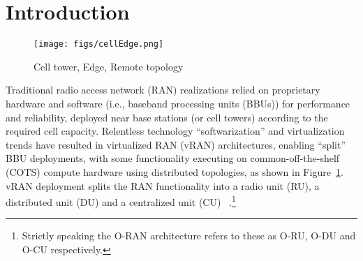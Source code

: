 \section{Introduction}

\begin{figure}
  \centering
        \texttt{[image: figs/cellEdge.png]}
        \caption{Cell tower, Edge, Remote topology}
        \label{fig:disttopo}
\end{figure}

Traditional radio access network (RAN) realizations relied on proprietary hardware and software (i.e., baseband processing units (BBUs)) for performance and reliability, deployed near base stations (or cell towers) according to the required cell capacity. Relentless technology ``softwarization'' and virtualization trends have resulted in virtualized RAN (vRAN) architectures, enabling ``split'' BBU deployments, with some functionality executing on common-off-the-shelf (COTS) compute hardware using distributed topologies, as shown in Figure~\ref{fig:disttopo}.
vRAN deployment splits the RAN functionality into a radio unit (RU), a distributed unit (DU) and a centralized unit (CU)~\cite{ORAN} .\footnote{Strictly speaking the O-RAN architecture refers to these as O-RU, O-DU and O-CU respectively.}
